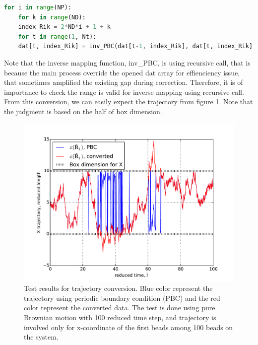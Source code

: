 \documentclass[10pt, a4paper]{article}
\begin{document}
\begin{appendices}
\begin{lstlisting}[language=Python, frame=single]
    for i in range(NP):
    for k in range(ND):
    index_Rik = 2*ND*i + 1 + k
    for t in range(1, Nt):
    dat[t, index_Rik] = inv_PBC(dat[t-1, index_Rik], dat[t, index_Rik], LB)
  \end{lstlisting}
  Note that the inverse mapping function, inv{\_}PBC, is using recursive call, that is because the main process override the opened dat array for effienciency issue, that sometimes amplified the existing gap during correction. Therefore, it is of importance to check the range is valid for inverse mapping using recursive call.
  From this conversion, we can easily expect the trajectory from figure \ref{fig:traj_conv}. Note that the judgment is based on the half of box dimension. 
  \begin{figure}
    \centering
    \includegraphics[width=\textwidth]{figures/converting_trajectory.pdf}
    \caption{Test results for trajectory conversion. Blue color represent the trajectory using periodic boundary condition (PBC) and the red color represent the converted data. The test is done using pure Brownian motion with 100 reduced time step, and trajectory is involved only for x-coordinate of the first beads among 100 beads on the system.}
    \label{fig:traj_conv}
  \end{figure}


\end{appendices}
\end{document}
